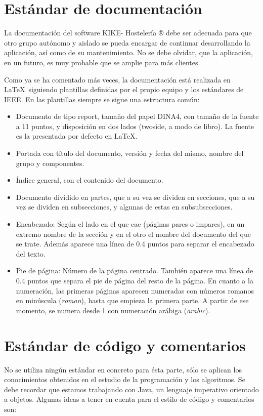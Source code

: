 \documentclass[spanish,a4paper,11pt, twoside]{report}	%
\begin{document}
	\section{Estándar de documentación}
	La documentación del software KIKE- Hostelería ® debe ser adecuada para que otro grupo autónomo y aislado se pueda encargar de continuar desarrollando la aplicación, así como de su mantenimiento. No se debe olvidar, que la aplicación, en un futuro, es muy probable que se amplie para más clientes.

	Como ya se ha comentado más veces, la documentación está realizada en \LaTeX \ siguiendo plantillas definidas por el propio equipo y los estándares de IEEE. En las plantillas siempre se sigue una estructura común:
	\begin{itemize}
		\item Documento de tipo report, tamaño del papel DINA4, con tamaño de la fuente a 11 puntos, y disposición en dos lados (twoside, a modo de libro). La fuente es la presentada por defecto en \LaTeX.
		\item Portada con título del documento, versión y fecha del mismo, nombre del grupo y componentes.
		\item Índice general, con el contenido del documento.
		\item Documento dividido en partes, que a su vez se dividen en secciones, que a su vez se dividen en subsecciones, y algunas de estas en subsubsecciones.
		\item Encabezado: Según el lado en el que cae (páginas pares o impares),  en un extremo nombre de la sección y en el otro el nombre del documento del que se trate. Además aparece una línea de 0.4 puntos para separar el encabezado del texto.
		\item Pie de página: Número de la página centrado. También aparece una línea de 0.4 puntos que separa el pie de página del resto de la página. En cuanto a la numeración, las primeras páginas aparecen numeradas con números romanos en minúscula (\textit{roman}), hasta que empieza la primera parte. A partir de ese momento, se numera desde 1 con numeración arábiga (\textit{arabic}).
	\end{itemize}

	\section{Estándar de código y comentarios}
	
	No se utiliza ningún estándar en concreto para ésta parte, sólo se aplican los conocimientos obtenidos en el estudio de la programación y los algoritmos. Se debe recordar que estamos trabajando con Java, un lenguaje imperativo orientado a objetos. Algunas ideas a tener en cuenta para el estilo de código y comentarios son:
\end{document}
